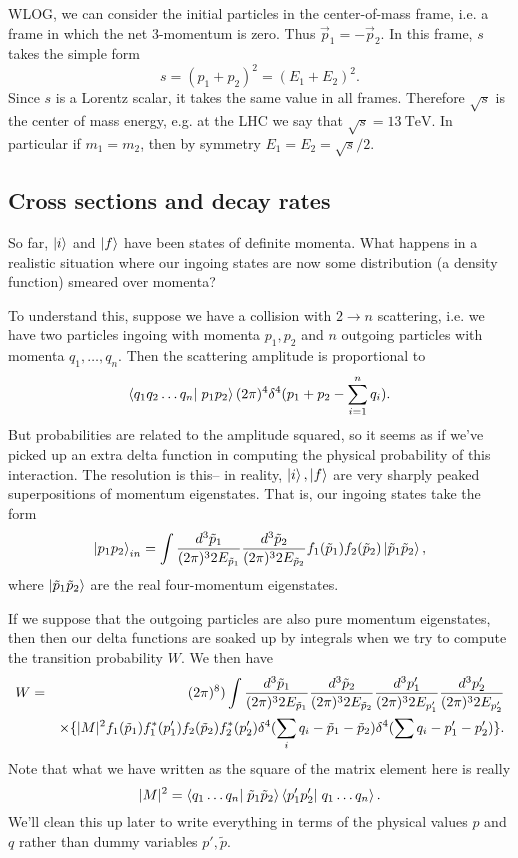 WLOG, we can consider the initial particles in the center-of-mass frame, i.e. a frame in which the net $3$-momentum is zero. Thus $\vec{p}_1=-\vec{p}_2.$
In this frame, $s$ takes the simple form
$$s=(p_1+p_2)^2=(E_1+E_2)^2.$$ Since $s$ is a Lorentz scalar, it takes the same value in all frames. Therefore $\sqrt{s}$ is the center of mass energy, e.g. at the LHC we say that $\sqrt{s}=\SI{13}{\tera\electronvolt}$. In particular if $m_1=m_2$, then by symmetry $E_1=E_2=\sqrt{s}/2.$

\subsection*{Cross sections and decay rates} So far, $\left| i \right>$ and $\left| f \right>$ have been states of definite momenta. What happens in a realistic situation where our ingoing states are now some distribution (a density function) smeared over momenta?

To understand this, suppose we have a collision with $2\to n$ scattering, i.e. we have two particles ingoing with momenta $p_1,p_2$ and $n$ outgoing particles with momenta $q_1,\ldots,q_n$. Then the scattering amplitude is proportional to
$$\braket{q_1 q_2\ldots q_n}{p_1p_2}(2\pi)^4 \delta^4(p_1+p_2 -\sum_{i=1}^n q_i).$$
But probabilities are related to the amplitude squared, so it seems as if we've picked up an extra delta function in computing the physical probability of this interaction. The resolution is this-- in reality, $\left| i \right>,\left| f \right>$ are very sharply peaked superpositions of momentum eigenstates. That is, our ingoing states take the form
$$\left| p_1p_2 \right>_{in}=\int \frac{d^3 \tilde p_1}{(2\pi)^3 2E_{\tilde p_1}}\frac{d^3 \tilde p_2}{(2\pi)^3 2E_{\tilde p_2}} f_1(\tilde p_1)f_2 (\tilde p_2)\left| \tilde p_1 \tilde p_2 \right>,$$
where $\left| \tilde p_1 \tilde p_2 \right>$ are the real four-momentum eigenstates.

If we suppose that the outgoing particles are also pure momentum eigenstates, then then our delta functions are soaked up by integrals when we try to compute the transition probability $W$. We then have
\begin{eqnarray*}
W&=&(2\pi)^8)\int \frac{d^3 \tilde p_1}{(2\pi)^3 2E_{\tilde p_1}} \frac{d^3 \tilde p_2}{(2\pi)^3 2E_{\tilde p_2}} \frac{d^3 p_1'}{(2\pi)^3 2E_{p_1'}} \frac{d^3 p_2'}{(2\pi)^3 2E_{p_2'}}\\ &&\times\{|M|^2 f_1(\tilde p_1)f_1^* (p_1')f_2(\tilde p_2)f_2^*(p_2')\delta^4(\sum_i q_i -\tilde p_1 -\tilde p_2)\delta^4(\sum q_i-p_1' -p_2')\}.
\end{eqnarray*}
Note that what we have written as the square of the matrix element here is really $$|M|^2=\braket{q_1\ldots q_n}{\tilde p_1 \tilde p_2}\braket{p_1'p_2'}{q_1\ldots q_n}.$$ We'll clean this up later to write everything in terms of the physical values $p$ and $q$ rather than dummy variables $p', \tilde p.$


